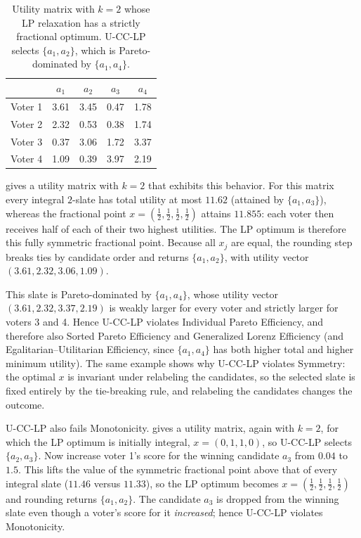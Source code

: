 \documentclass[letterpaper]{article} %
\newcommand{\LP}{\textsc{U-CC-LP}}
\begin{document}
\begin{table}[t]
\centering
\begin{tabular}{l|cccc}
\hline
 & $a_1$ & $a_2$ & $a_3$ & $a_4$ \\
\hline
Voter 1 & 3.61 & 3.45 & 0.47 & 1.78 \\
Voter 2 & 2.32 & 0.53 & 0.38 & 1.74 \\
Voter 3 & 0.37 & 3.06 & 1.72 & 3.37 \\
Voter 4 & 1.09 & 0.39 & 3.97 & 2.19 \\
\hline
\end{tabular}
\caption{Utility matrix with $k=2$ whose LP relaxation has a strictly fractional optimum.
\LP{} selects $\{a_1,a_2\}$, which is Pareto-dominated by $\{a_1,a_4\}$.}
\label{tab:lp-fractional}
\end{table}

 gives a utility matrix with $k=2$ that exhibits this behavior.
For this matrix every integral $2$-slate has total utility at most $11.62$ (attained by $\{a_1,a_3\}$), whereas the fractional point $x=(\tfrac12,\tfrac12,\tfrac12,\tfrac12)$ attains $11.855$: each voter then receives half of each of their two highest utilities.
The LP optimum is therefore this fully symmetric fractional point.
Because all $x_j$ are equal, the rounding step breaks ties by candidate order and returns $\{a_1,a_2\}$, with utility vector $(3.61,2.32,3.06,1.09)$.

This slate is Pareto-dominated by $\{a_1,a_4\}$, whose utility vector $(3.61,2.32,3.37,2.19)$ is weakly larger for every voter and strictly larger for voters 3 and 4.
Hence \LP{} violates Individual Pareto Efficiency, and therefore also Sorted Pareto Efficiency and Generalized Lorenz Efficiency (and Egalitarian--Utilitarian Efficiency, since $\{a_1,a_4\}$ has both higher total and higher minimum utility).
The same example shows why \LP{} violates Symmetry: the optimal $x$ is invariant under relabeling the candidates, so the selected slate is fixed entirely by the tie-breaking rule, and relabeling the candidates changes the outcome.

\LP{} also fails Monotonicity.
 gives a utility matrix, again with $k=2$, for which the LP optimum is initially integral, $x=(0,1,1,0)$, so \LP{} selects $\{a_2,a_3\}$.
Now increase voter 1's score for the winning candidate $a_3$ from $0.04$ to $1.5$.
This lifts the value of the symmetric fractional point above that of every integral slate ($11.46$ versus $11.33$), so the LP optimum becomes $x=(\tfrac12,\tfrac12,\tfrac12,\tfrac12)$ and rounding returns $\{a_1,a_2\}$.
The candidate $a_3$ is dropped from the winning slate even though a voter's score for it \emph{increased}; hence \LP{} violates Monotonicity.
\end{document}
